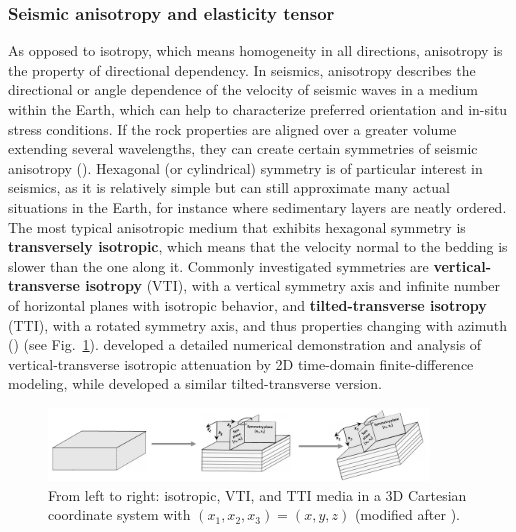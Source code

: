 \subsubsection{Seismic anisotropy and elasticity tensor}
As opposed to isotropy, which means homogeneity in all directions, anisotropy is the property of directional dependency. In seismics, anisotropy describes the directional or angle dependence of the velocity of seismic waves in a medium within the Earth, which can help to characterize preferred orientation and in-situ stress conditions. If the rock properties are aligned over a greater volume extending several wavelengths, they can create certain symmetries of seismic anisotropy (\cite{Thomsen:86}). Hexagonal (or cylindrical) symmetry is of particular interest in seismics, as it is relatively simple but can still approximate many actual situations in the Earth, for instance where sedimentary layers are neatly ordered. The most typical anisotropic medium that exhibits hexagonal symmetry is \textbf{transversely isotropic}, which means that the velocity normal to the bedding is slower than the one along it. Commonly investigated symmetries are \textbf{vertical-transverse isotropy} (VTI), with a vertical symmetry axis and infinite number of horizontal planes with isotropic behavior, and \textbf{tilted-transverse isotropy} (TTI), with a rotated symmetry axis, and thus properties changing with azimuth (\cite{Tsvankin:12}) (see Fig.~\ref{fig:tti}). \citet{Bai:16} developed a detailed numerical demonstration and analysis of vertical-transverse isotropic attenuation by 2D time-domain finite-difference modeling, while \citet{Oh:20} developed a similar tilted-transverse version. 
\begin{figure}[h!]
    \centering
    \includegraphics[width=0.9\textwidth]{figures/tti.png}
    \caption{From left to right: isotropic, VTI, and TTI media in a 3D Cartesian coordinate system with $(x_1,x_2,x_3) = (x,y,z)$ (modified after \cite{TGSwebsite}).}
    \label{fig:tti}
\end{figure}

